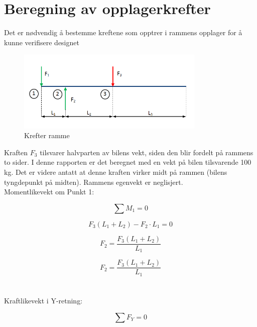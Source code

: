 \section{Beregning av opplagerkrefter}
Det er nødvendig å bestemme kreftene som opptrer i rammens opplager for å kunne verifisere designet


\begin{figure}[H]
\begin{center}
\leavevmode
\includegraphics[width=0.8\textwidth]{images/Bilden_1}
\end{center}
\caption{Krefter ramme}
\label{fig:Krefter}
\end{figure}


Kraften $F_3$ tilsvarer halvparten av bilens vekt, siden den blir fordelt på rammens to sider. I denne rapporten er det beregnet med en vekt på bilen tilsvarende 100 kg. Det er videre antatt at denne kraften virker midt på rammen (bilens tyngdepunkt på midten). Rammens egenvekt er neglisjert. \\



Momentlikevekt om Punkt 1:

\begin{equation}
\sum{M_1}=0
\end{equation}

\begin{equation}
F_3(L_1+L_2)-F_2\cdot L_1=0
\end{equation}
 
\begin{equation}
F_2=\frac{F_3(L_1+L_2)}{L_1}
\end{equation}

\begin{equation}
F_2=\frac{F_3(L_1+L_2)}{L_1}
\end{equation}\\\\

Kraftlikevekt i Y-retning:


\begin{equation}
\sum{F_Y}=0
\end{equation}

